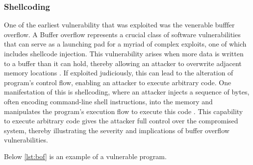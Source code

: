 \documentclass{article}
\begin{document}
\subsubsection{Shellcoding}
\begin{comment}
  shellcoding
  reference smashing the stack for fun and profit
\end{comment}
One of the earliest vulnerability that was exploited was the venerable bufffer
overflow. A Buffer overflow represents a crucial class of software
vulnerabilities that can serve as a launching pad for a myriad of complex
exploits, one of which includes shellcode injection. This vulnerability arises
when more data is written to a buffer than it can hold, thereby allowing an
attacker to overwrite adjacent memory locations \cite{seacord2013}. If exploited
judiciously, this can lead to the alteration of program's control flow, enabling
an attacker to execute arbitrary code. One manifestation of this is shellcoding,
where an attacker injects a sequence of bytes, often encoding command-line shell
instructions, into the memory and manipulates the program's execution flow to
execute this code \cite{one1996smashing}. This capability to execute arbitrary
code gives the attacker full control over the compromised system, thereby
illustrating the severity and implications of buffer overflow vulnerabilities.

Below \ref{lst:bof} is an example of a vulnerable program.
\end{document}
